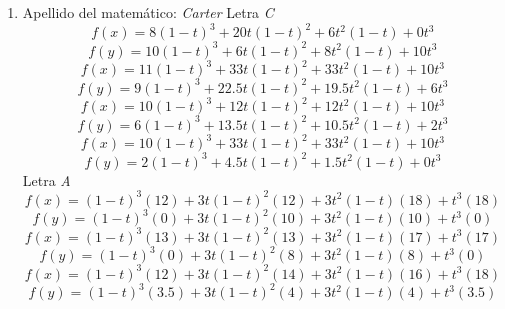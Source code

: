 \documentclass[11pt]{article}
\begin{document}
\begin{enumerate}
\item 
Apellido del matemático: \emph{Carter}
Letra \emph{C}
\begin{equation}
f(x) = 8(1-t)^3 + 20t(1-t)^2 + 6t^2(1-t)+ 0t^3 
\end{equation}
\begin{equation}
f(y) = 10(1-t)^3 + 6t(1-t)^2 + 8t^2(1-t)+ 10t^3 
\end{equation}
\begin{equation}
f(x) = 11(1-t)^3 + 33t(1-t)^2 +33t^2(1-t)+ 10t^3 
\end{equation}
\begin{equation}
f(y) = 9(1-t)^3 + 22.5t(1-t)^2 + 19.5t^2(1-t)+ 6t^3 
\end{equation}
\begin{equation}
f(x) = 10(1-t)^3 + 12t(1-t)^2 + 12t^2(1-t)+ 10t^3 
\end{equation}
\begin{equation}
f(y) = 6(1-t)^3 + 13.5t(1-t)^2 + 10.5t^2(1-t)+ 2t^3 
\end{equation}
\begin{equation}
f(x) = 10(1-t)^3 + 33t(1-t)^2 + 33t^2(1-t)+ 10t^3 
\end{equation}
\begin{equation}
f(y) = 2(1-t)^3 + 4.5t(1-t)^2 + 1.5t^2(1-t)+ 0t^3 
\end{equation}
Letra \emph{A}
\begin{equation}
f(x)= (1-t)^{3}\left(12\right)+3t(1-t)^{2}\left(12\right)+3t^{2}(1-t)\left(18\right)+t^{3}\left(18\right)
\end{equation}
\begin{equation}
f(y)=(1-t)^{3}\left(0\right)+3t(1-t)^{2}\left(10\right)+3t^{2}(1-t)\left(10\right)+t^{3}\left(0\right)
\end{equation}
\begin{equation}
f(x)=(1-t)^{3}\left(13\right)+3t(1-t)^{2}\left(13\right)+3t^{2}(1-t)\left(17\right)+t^{3}\left(17\right)
\end{equation}
\begin{equation}
f(y)=(1-t)^{3}\left(0\right)+3t(1-t)^{2}\left(8\right)+3t^{2}(1-t)\left(8\right)+t^{3}\left(0\right)
\end{equation}
\begin{equation}
f(x)=(1-t)^{3}\left(12\right)+3t(1-t)^{2}\left(14\right)+3t^{2}(1-t)\left(16\right)+t^{3}\left(18\right)
\end{equation}
\begin{equation}
f(y)=(1-t)^{3}\left(3.5\right)+3t(1-t)^{2}\left(4\right)+3t^{2}(1-t)\left(4\right)+t^{3}\left(3.5\right)
\end{equation}


\end{enumerate}
\end{document}
